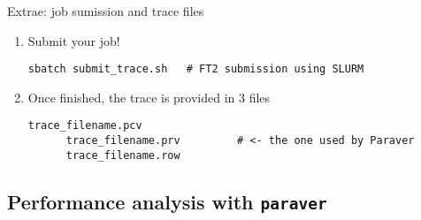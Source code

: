\documentclass[10pt,xcolor=table]{beamer}
\begin{document}


\begin{frame}[fragile]{Extrae: job sumission and trace files}
  \begin{enumerate}
  \item Submit your job!
    \begin{lstlisting}[style=shell,gobble=5]
      sbatch submit_trace.sh   # FT2 submission using SLURM
    \end{lstlisting}
  \item Once finished, the trace is provided in 3 files
    \begin{lstlisting}[style=shell,gobble=5]
      trace_filename.pcv
      trace_filename.prv         # <- the one used by Paraver
      trace_filename.row
    \end{lstlisting}
  \end{enumerate}
\end{frame}

\subsection{Performance analysis with {\tt paraver}}
\end{document}
